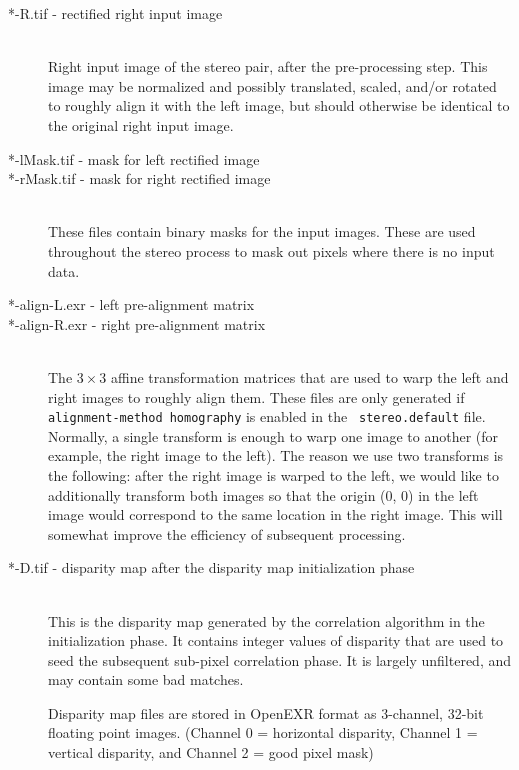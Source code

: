 \begin{description}
\item[*-R.tif - \textnormal{rectified right input image}] \hfill \\
  Right input image of the stereo pair, after the pre-processing
  step.  This image may be normalized and possibly
    translated, scaled, and/or rotated to roughly align it with the left
    image, but should otherwise be identical to the original right
  input image.

\item[*-lMask.tif \textnormal{- mask for left rectified image}]
\item[*-rMask.tif \textnormal{- mask for right rectified image}] \hfill \\
  These files contain binary masks for the input images.  These are
  used throughout the stereo process to mask out pixels where there is
  no input data.

\item[*-align-L.exr \textnormal{- left pre-alignment matrix}]
\item[*-align-R.exr \textnormal{- right pre-alignment matrix}] \hfill \\
 The $3 \times 3$ affine transformation matrices that are used to warp
 the left and right images to roughly align them. These files are only
 generated if \texttt{alignment-method homography} is enabled in the {\tt
 stereo.default} file. Normally, a single transform is enough to warp one
 image to another (for example, the right image to the left). The reason
 we use two transforms is the following: after the right image is warped
 to the left, we would like to additionally transform both images so that
 the origin (0, 0) in the left image would correspond to the same
 location in the right image. This will somewhat improve the efficiency
 of subsequent processing.

\item[*-D.tif \textnormal{- disparity map after the disparity map initialization phase}] \hfill \\
  This is the disparity map generated by the correlation algorithm in
  the initialization phase.  It contains integer values of disparity
  that are used to seed the subsequent sub-pixel correlation phase.
  It is largely unfiltered, and may contain some bad matches.

  Disparity map files are stored in OpenEXR format as 3-channel,
  32-bit floating point images.  (Channel 0 = horizontal disparity,
  Channel 1 = vertical disparity, and Channel 2 = good pixel mask)


\end{description}
